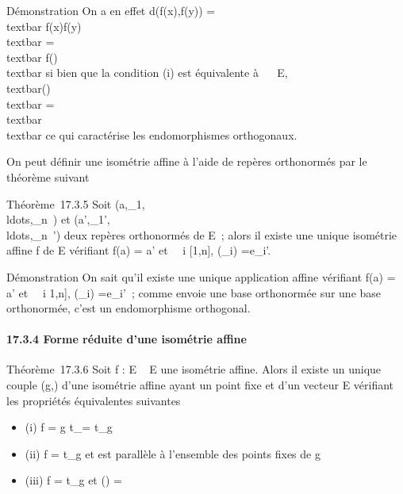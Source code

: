 \documentclass[]{article}
\begin{document}
Démonstration On a en effet d(f(x),f(y))
=\\textbar{}\overrightarrow
f(x)f(y)\\textbar{}
=\\textbar{}\vec
f(\overrightarrowxy)\\textbar{} si
bien que la condition (i) est équivalente à
\forall~\overrightarrow\xi~
\in\overrightarrow E,
\\textbar{}\vecf(\overrightarrow\xi)\\textbar{}
=\\textbar{}\overrightarrow
\xi\\textbar{} ce qui caractérise les endomorphismes
orthogonaux.

On peut définir une isométrie affine à l'aide de repères orthonormés par
le théorème suivant

Théorème~17.3.5 Soit
(a,\vece\_1,\\ldots,\vece\_n~)
et
(a',\vece\_1',\\ldots,\vece\_n~')
deux repères orthonormés de E~; alors il existe une unique isométrie
affine f de E vérifiant f(a) = a' et \forall~~i \in
{[}1,n{]}, \vecf(\vece\_i)
=\vec e\_i'.

Démonstration On sait qu'il existe une unique application affine
vérifiant f(a) = a' et \forall~~i \in {[}1,n{]},
\vecf(\vece\_i)
=\vec e\_i'~; comme \vecf
envoie une base orthonormée sur une base orthonormée, c'est un
endomorphisme orthogonal.

\paragraph{17.3.4 Forme réduite d'une isométrie affine}

Théorème~17.3.6 Soit f : E \rightarrow~ E une isométrie affine. Alors il existe un
unique couple (g,\overrightarrow\xi) d'une isométrie
affine ayant un point fixe et d'un vecteur
\overrightarrow\xi \in\overrightarrow
E vérifiant les propriétés équivalentes suivantes

\begin{itemize}
\itemsep1pt\parskip0pt
\item
  (i) f = g \cdot t\_\overrightarrow\xi =
  t\_\overrightarrow\xi \cdot g
\item
  (ii) f = t\_\overrightarrow\xi \cdot g et
  \overrightarrow\xi est parallèle à l'ensemble des
  points fixes de g
\item
  (iii) f = t\_\overrightarrow\xi \cdot g et
  \vecf(\overrightarrow\xi)
  =\overrightarrow \xi
\end{itemize}
\end{document}
